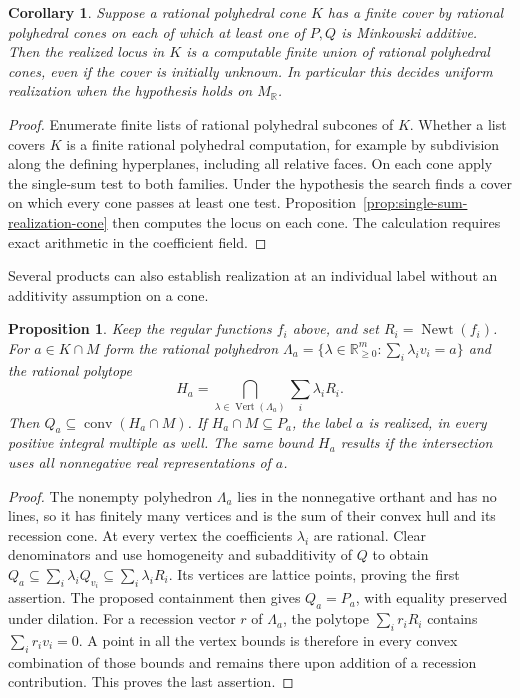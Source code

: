 \documentclass[11pt,reqno]{amsart}
\numberwithin{equation}{section}
\newtheorem{proposition}[theorem]{Proposition}
\newtheorem{corollary}[theorem]{Corollary}
\theoremstyle{definition}
\theoremstyle{remark}
\DeclareMathOperator{\Newt}{Newt}
\begin{document}
\begin{corollary}\label{cor:finite-mixed-realization-cover}
Suppose a rational polyhedral cone \(K\) has a finite cover by rational
polyhedral cones on each of which at least one of \(P,Q\) is Minkowski
additive. Then the realized locus in \(K\) is a computable finite union
of rational polyhedral cones, even if the cover is initially unknown.
In particular this decides uniform realization when the hypothesis
holds on \(M_{\mathbb R}\).
\end{corollary}
\begin{proof}
Enumerate finite lists of rational polyhedral subcones of \(K\).
Whether a list covers \(K\) is a finite rational polyhedral computation,
for example by subdivision along the defining hyperplanes, including
all relative faces. On each cone apply the single-sum test to both
families. Under the hypothesis the search finds a cover on which
every cone passes at least one test. Proposition~\ref{prop:single-sum-realization-cone}
then computes the locus on each cone. The calculation requires exact arithmetic in the coefficient field.
\end{proof}

Several products can also establish realization at an individual
label without an additivity assumption on a cone.
\begin{proposition}\label{prop:product-window-integer-hull}
Keep the regular functions \(f_i\) above, and set \(R_i=\Newt(f_i)\).
For \(a\in K\cap M\) form the rational polyhedron
\(\Lambda_a=\{\lambda\in\mathbb R_{\ge0}^m:\sum_i\lambda_iv_i=a\}\)
and the rational polytope
\[ H_a=\bigcap_{\lambda\in\operatorname{Vert}(\Lambda_a)} \sum_i\lambda_iR_i . \]
Then \(Q_a\subseteq\operatorname{conv}(H_a\cap M)\). If
\(H_a\cap M\subseteq P_a\), the label \(a\) is realized, in every
positive integral multiple as well. The same bound \(H_a\) results if
the intersection uses all nonnegative real representations of \(a\).
\end{proposition}
\begin{proof}
The nonempty polyhedron \(\Lambda_a\) lies in the nonnegative orthant
and has no lines, so it has finitely many vertices and is the sum
of their convex hull and its recession cone. At every vertex the
coefficients \(\lambda_i\) are rational. Clear denominators and
use homogeneity and subadditivity of \(Q\) to obtain
\(Q_a\subseteq\sum_i\lambda_i Q_{v_i}\subseteq\sum_i\lambda_i R_i\).
Its vertices are lattice points, proving the first assertion.
The proposed containment then gives \(Q_a=P_a\), with equality
preserved under dilation. For a recession vector \(r\) of \(\Lambda_a\),
the polytope \(\sum_i r_i R_i\) contains \(\sum_i r_i v_i=0\).
A point in all the vertex bounds is therefore in every convex
combination of those bounds and remains there upon addition of a
recession contribution. This proves the last assertion.
\end{proof}
\end{document}
